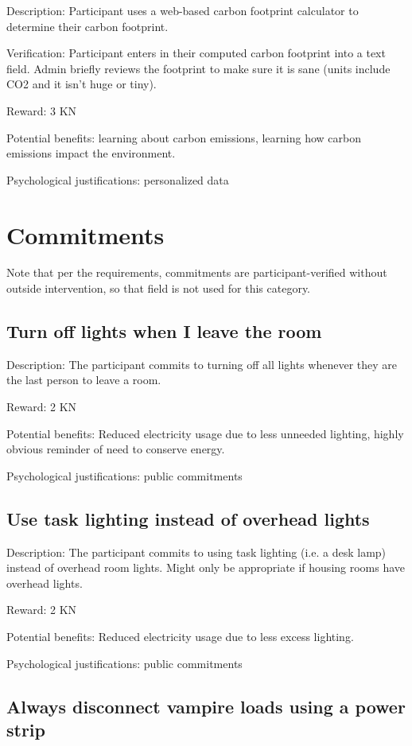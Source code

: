 Description: Participant uses a web-based carbon footprint calculator to determine their carbon footprint.

Verification: Participant enters in their computed carbon footprint into a text field. Admin briefly reviews the footprint to make sure it is sane (units include CO2 and it isn't huge or tiny).

Reward: 3 KN

Potential benefits: learning about carbon emissions, learning how carbon emissions impact the environment.

Psychological justifications: personalized data


\section{Commitments}

Note that per the requirements, commitments are participant-verified without outside intervention, so that field is not used for this category.

\subsection{Turn off lights when I leave the room}

Description: The participant commits to turning off all lights whenever they are the last person to leave a room.

Reward: 2 KN

Potential benefits: Reduced electricity usage due to less unneeded lighting, highly obvious reminder of need to conserve energy.

Psychological justifications: public commitments

\subsection{Use task lighting instead of overhead lights}

Description: The participant commits to using task lighting (i.e. a desk lamp) instead of overhead room lights. Might only be appropriate if housing rooms have overhead lights.

Reward: 2 KN

Potential benefits: Reduced electricity usage due to less excess lighting.

Psychological justifications: public commitments

\subsection{Always disconnect vampire loads using a power strip}

